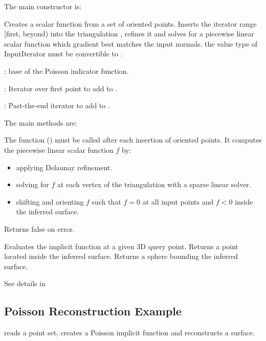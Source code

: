 The main constructor is:

{
Creates a scalar function from a set of oriented points. Inserts the iterator range [first, beyond) into the triangulation , refines it and solves for a piecewise linear scalar function which gradient best matches the input normals.
\ccPrecond the value type of InputIterator must be convertible to .
\begin{description}
\item {}:  base of the Poisson indicator function. \item {}: Iterator over first point to add to . \item {}: Past-the-end iterator to add to . \end{description}
}

The main methods are:

{
The function () must be called after each insertion of oriented points. It computes the piecewise linear scalar function $f$ by:
\begin{itemize}
\item applying Delaunay refinement.
\item solving for $f$ at each vertex of the triangulation with a sparse linear solver.
\item shifting and orienting $f$ such that $f=0$ at all input points and $f<0$ inside the inferred surface.
\end{itemize}
Returns false on error.
}
\ccGlue
{}
{
Evaluates the implicit function at a given 3D query point.
}
\ccGlue
{}
{
Returns a point located inside the inferred surface.
}
{
Returns a sphere bounding the inferred surface.
}

See details in \\


\subsection{Poisson Reconstruction Example}

 reads a point set, creates a Poisson implicit function and reconstructs a surface.



